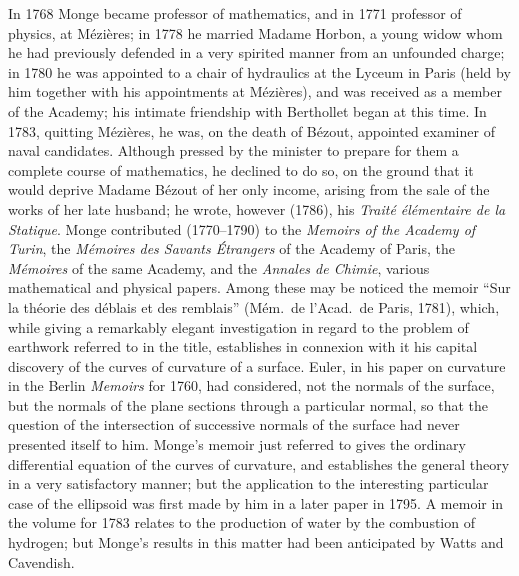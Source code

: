 \documentclass[11pt,a4paper]{article}
\begin{document}
In 1768 Monge became professor of mathematics, and in 1771 professor of physics, at M\'ezi\`eres; in 1778 he married Madame Horbon, a young widow whom he had previously defended in a very spirited manner from an unfounded charge; in 1780 he was appointed to a chair of hydraulics at the Lyceum in Paris (held by him together with his appointments at M\'ezi\`eres), and was received as a member of the Academy; his intimate friendship with Berthollet began at this time. In 1783, quitting M\'ezi\`eres, he was, on the death of B\'ezout, appointed examiner of naval candidates. Although pressed by the minister to prepare for them a complete course of mathematics, he declined to do so, on the ground that it would deprive Madame B\'ezout of her only income, arising from the sale of the works of her late husband; he wrote, however (1786), his \textit{Trait\'e \'el\'ementaire de la Statique}. Monge contributed (1770--1790) to the \textit{Memoirs of the Academy of Turin}, the \textit{M\'emoires des Savants \'Etrangers} of the Academy of Paris, the \textit{M\'emoires} of the same Academy, and the \textit{Annales de Chimie}, various mathematical and physical papers. Among these may be noticed the memoir ``Sur la th\'eorie des d\'eblais et des remblais'' (M\'em.\ de l'Acad.\ de Paris, 1781), which, while giving a remarkably elegant investigation in regard to the problem of earthwork referred to in the title, establishes in connexion with it his capital discovery of the curves of curvature of a surface. Euler, in his paper on curvature in the Berlin \textit{Memoirs} for 1760, had considered, not the normals of the surface, but the normals of the plane sections through a particular normal, so that the question of the intersection of successive normals of the surface had never presented itself to him. Monge's memoir just referred to gives the ordinary differential equation of the curves of curvature, and establishes the general theory in a very satisfactory manner; but the application to the interesting particular case of the ellipsoid was first made by him in a later paper in 1795. A memoir in the volume for 1783 relates to the production of water by the combustion of hydrogen; but Monge's results in this matter had been anticipated by Watts and Cavendish.
\end{document}
